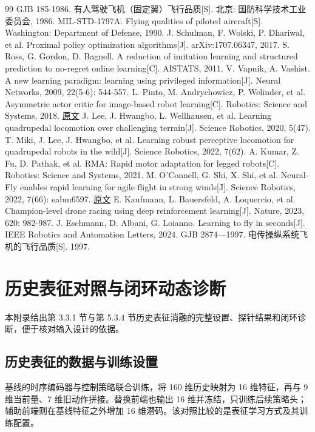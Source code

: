 \documentclass[UTF8,a4paper,11pt,fontset=fandol,scheme=plain]{ctexart}
\begin{document}
\FloatBarrier
\begin{thebibliography}{99}
 GJB 185-1986. 有人驾驶飞机（固定翼）飞行品质[S]. 北京: 国防科学技术工业委员会, 1986.
 MIL-STD-1797A. Flying qualities of piloted aircraft[S]. Washington: Department of Defense, 1990.
 J. Schulman, F. Wolski, P. Dhariwal, et al. Proximal policy optimization algorithms[J]. arXiv:1707.06347, 2017.
 S. Ross, G. Gordon, D. Bagnell. A reduction of imitation learning and structured prediction to no-regret online learning[C]. AISTATS, 2011.
 V. Vapnik, A. Vashist. A new learning paradigm: learning using privileged information[J]. Neural Networks, 2009, 22(5-6): 544-557.
 L. Pinto, M. Andrychowicz, P. Welinder, et al. Asymmetric actor critic for image-based robot learning[C]. Robotics: Science and Systems, 2018. \href{https://www.roboticsproceedings.org/rss14/p08.html}{原文}
 J. Lee, J. Hwangbo, L. Wellhausen, et al. Learning quadrupedal locomotion over challenging terrain[J]. Science Robotics, 2020, 5(47).
 T. Miki, J. Lee, J. Hwangbo, et al. Learning robust perceptive locomotion for quadrupedal robots in the wild[J]. Science Robotics, 2022, 7(62).
 A. Kumar, Z. Fu, D. Pathak, et al. RMA: Rapid motor adaptation for legged robots[C]. Robotics: Science and Systems, 2021.
 M. O'Connell, G. Shi, X. Shi, et al. Neural-Fly enables rapid learning for agile flight in strong winds[J]. Science Robotics, 2022, 7(66): eabm6597. \href{https://doi.org/10.1126/scirobotics.abm6597}{原文}
 E. Kaufmann, L. Bauersfeld, A. Loquercio, et al. Champion-level drone racing using deep reinforcement learning[J]. Nature, 2023, 620: 982-987.
 J. Eschmann, D. Albani, G. Loianno. Learning to fly in seconds[J]. IEEE Robotics and Automation Letters, 2024.
 GJB 2874—1997. 电传操纵系统飞机的飞行品质[S]. 1997.
\end{thebibliography}
\FloatBarrier
\appendix
{}
\section{历史表征对照与闭环动态诊断}
\hypertarget{appendix-history}{}\label{appendix-history}
本附录给出第 3.3.1 节与第 5.3.4 节历史表征消融的完整设置、探针结果和闭环诊断，便于核对输入设计的依据。

\subsection{历史表征的数据与训练设置}
\hypertarget{s611}{}\label{s611}
基线的时序编码器与控制策略联合训练，将 160 维历史映射为 16 维特征，再与 9 维当前量、7 维旧动作拼接。替换前端也输出 16 维并冻结，只训练后续策略头；辅助前端则在基线特征之外增加 16 维潜码。该对照比较的是表征学习方式及其训练配置。
\end{document}
